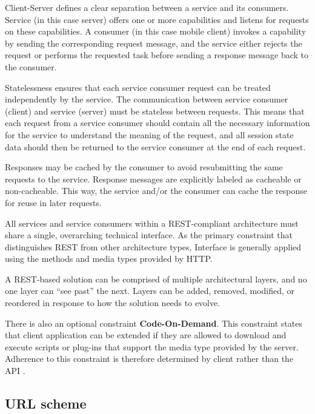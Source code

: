 \begin{itemize}

Client-Server defines a clear separation between a service and its consumers. Service (in this case server) offers one
or more capabilities and listens for requests on these capabilities. A consumer (in this case mobile client) invokes a
capability by sending the corresponding request message, and the service either rejects the request or performs
the requested task before sending a response message back to the consumer.

Statelessness ensures that each service consumer request can be treated independently by the service. The communication
between service consumer (client) and service (server) must be stateless between requests. This means that each request
from a service consumer should contain all the necessary information for the service to understand the meaning of
the request, and all session state data should then be returned to the service consumer at the end of each request.

Responses may be cached by the consumer to avoid resubmitting the same requests to the service. Response messages  are
explicitly labeled as cacheable or non-cacheable. This way, the service and/or the consumer can cache the response for
reuse in later requests.

All services and service consumers within a REST-compliant architecture must share a single, overarching technical
interface. As the primary constraint that distinguishes REST from other architecture types, Interface is generally
applied using the methods and media types provided by HTTP.

A REST-based solution can be comprised of multiple architectural layers, and no one layer can ``see past'' the next.
Layers can be added, removed, modified, or reordered in response to how the solution needs to evolve.

\end{itemize}

There is also an optional constraint \textbf{Code-On-Demand}. This constraint states that client application can be
extended if they are allowed to download and execute scripts or plug-ins that support the media type provided by
the server. Adherence to this constraint is therefore determined by client rather than the API \cite{rest}.


\subsection{URL scheme}



